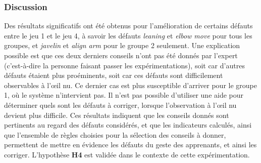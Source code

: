 
\subsubsection{Discussion}
Des résultats significatifs ont été obtenus pour l'amélioration de certains défauts entre le jeu 1 et le jeu 4, à savoir les défauts \textit{leaning} et \textit{elbow move} pour tous les groupes, et \textit{javelin} et \textit{align arm} pour le groupe 2 seulement. Une explication possible est que ces deux derniers conseils n'ont pas été donnés par l'expert (c'est-à-dire la personne faisant passer les expérimentations), soit car d'autres défauts étaient plus proéminents, soit car ces défauts sont difficilement observables à l'œil nu. Ce dernier cas est plus susceptible d'arriver pour le groupe 1, où le système n'intervient pas. Il n'est pas possible d'utiliser une aide pour déterminer quels sont les défauts à corriger, lorsque l'observation à l'œil nu devient plus difficile. Ces résultats indiquent que les conseils donnés sont pertinents au regard des défauts considérés, et que les indicateurs calculés, ainsi que l'ensemble de règles choisies pour la sélection des conseils à donner, permettent de mettre en évidence les défauts du geste des apprenants, et ainsi les corriger. L'hypothèse \textbf{H4} est validée dans le contexte de cette expérimentation.

